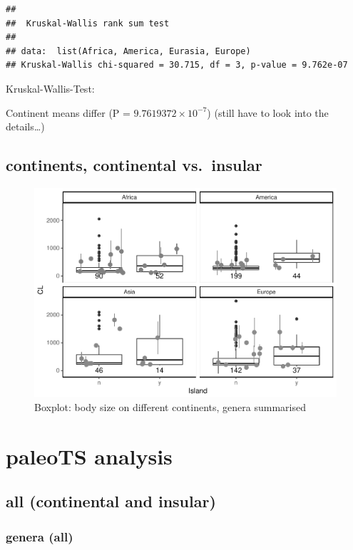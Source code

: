 \documentclass[]{article}
\begin{document}
\begin{verbatim}
## 
##  Kruskal-Wallis rank sum test
## 
## data:  list(Africa, America, Eurasia, Europe)
## Kruskal-Wallis chi-squared = 30.715, df = 3, p-value = 9.762e-07
\end{verbatim}

Kruskal-Wallis-Test:

Continent means differ (P = \(9.7619372\times 10^{-7}\)) (still have to
look into the details\ldots{})

\newpage

\subsection{continents, continental
vs.~insular}\label{continents-continental-vs.insular}

\begin{figure}[htbp]
\centering
\includegraphics{MA_JJ_files/figure-latex/BPConCI-1.pdf}
\caption{Boxplot: body size on different continents, genera summarised}
\end{figure}

\newpage

\section{paleoTS analysis}\label{paleots-analysis}

\subsection{all (continental and
insular)}\label{all-continental-and-insular}

\subsubsection{genera (all)}\label{genera-all}
\end{document}
